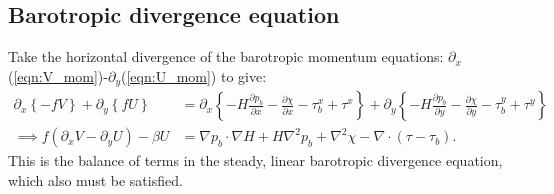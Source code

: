 \documentclass[10pt]{amsart}
\begin{document}
\subsection{Barotropic divergence equation}
\label{sect:BDE}
Take the horizontal divergence of the barotropic momentum equations: $\partial_x$(\ref{eqn:V_mom})-$\partial_y$(\ref{eqn:U_mom}) to give:
 \begin{align}
\partial_x \left\{ - f V \right\}  + \partial_y \left\{ f  U \right\}& =  
\partial_x \left\{ - H \frac{\partial p_b}{\partial x} - \frac{\partial \chi}{\partial x}  - \tau^x_b + \tau^x \right\} +
\partial_y \left\{ - H \frac{\partial p_b}{\partial y} - \frac{\partial \chi }{\partial y}  - \tau^y_b + \tau^y \right\} \nonumber \\
\implies
f \left( \partial_x V - \partial_y U  \right) - \beta U & =  \nabla p_b \cdot \nabla H + H \nabla^2 p_b + \nabla^2 \chi - \nabla \cdot  \left( \tau - \tau_b \right) .
\end{align}
This is the balance of terms in the steady, linear barotropic divergence equation, which also must be satisfied.
\end{document}
